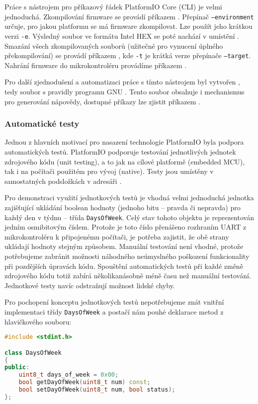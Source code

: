 Práce s nástrojem pro příkazový řádek PlatformIO Core (CLI) je velmi
jednoduchá. Zkompilování firmware se provádí příkazem
. Přepínač \texttt{--environment} určuje,
pro jakou platformu se má firmware zkompilovat. Lze použít jeho krátkou verzi
\texttt{-e}. Výsledný soubor ve formátu Intel HEX se poté nachází v umístění
. Smazání všech zkompilovaných souborů
(užitečné pro vynucení úplného překompilování) se provádí příkazem
, kde \texttt{-t} je krátká verze přepínače
\texttt{--target}. Nahrání firmware do mikrokontroléru provádíme příkazem
.

Pro další zjednodušení a automatizaci práce s tímto nástrojem byl vytvořen
, tedy soubor s pravidly programu GNU .
Tento soubor obsahuje i mechanismus pro generování nápovědy, dostupné příkazy
lze zjistit příkazem .

\subsubsection{Automatické testy}
Jednou z hlavních motivací pro nasazení technologie PlatformIO byla podpora
automatických testů. PlatformIO podporuje testování jednotlivých jednotek
zdrojového kódu (unit testing), a to jak na cílové platformě (embedded MCU),
tak i na počítači použitém pro vývoj (native). Testy jsou umístěny
v samostatných podsložkách v adresáři .

Pro demonstraci využití jednotkových testů je vhodná velmi jednoduchá jednotka
zajišťující ukládání boolean hodnoty (jednoho bitu -- pravda či nepravda) pro
každý den v týdnu -- třída \texttt{DaysOfWeek}. Celý stav tohoto objektu je
reprezentován jedním osmibitovým číslem. Protože je toto číslo přenášeno
rozhraním UART z mikrokontroléru k připojenému počítači, je potřeba zajistit,
že obě strany ukládají hodnoty stejným způsobem. Manuální testování není
vhodné, protože potřebujeme zabránit možnosti náhodného neúmyslného poškození
funkcionality při pozdějších úpravách kódu. Spouštění automatických testů při
každé změně zdrojového kódu totiž zabírá několikanásobně méně času než manuální
testování. Jednotkové testy navíc odstraňují možnost lidské chyby.

Pro pochopení konceptu jednotkových testů nepotřebujeme znát vnitřní
implementaci třídy \texttt{DaysOfWeek} a postačí nám pouhé deklarace
metod z hlavičkového souboru:
\begin{lstlisting}[language=C++]
#include <stdint.h>

class DaysOfWeek
{
public:
    uint8_t days_of_week = 0x00;
    bool getDayOfWeek(uint8_t num) const;
    bool setDayOfWeek(uint8_t num, bool status);
};
\end{lstlisting}

